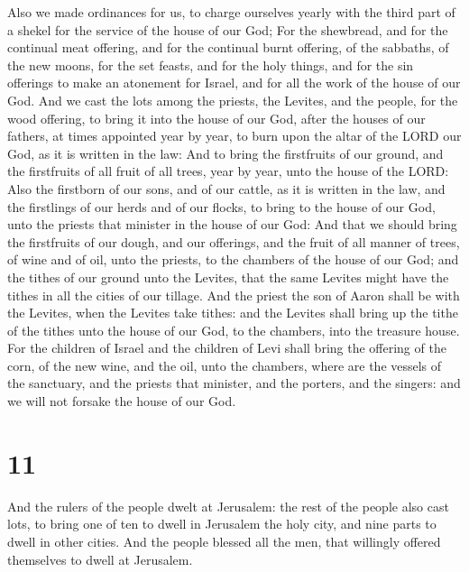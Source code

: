  Also we made ordinances for us, to charge ourselves
yearly with the third part of a shekel for the service of the house of
our God;  For the shewbread, and for the continual meat
offering, and for the continual burnt offering, of the sabbaths, of the
new moons, for the set feasts, and for the holy things, and for the sin
offerings to make an atonement for Israel, and for all the work of the
house of our God.  And we cast the lots among the
priests, the Levites, and the people, for the wood offering, to bring it
into the house of our God, after the houses of our fathers, at times
appointed year by year, to burn upon the altar of the LORD our God, as
it is written in the law:  And to bring the firstfruits
of our ground, and the firstfruits of all fruit of all trees, year by
year, unto the house of the LORD:  Also the firstborn of
our sons, and of our cattle, as it is written in the law, and the
firstlings of our herds and of our flocks, to bring to the house of our
God, unto the priests that minister in the house of our God:
 And that we should bring the firstfruits of our dough,
and our offerings, and the fruit of all manner of trees, of wine and of
oil, unto the priests, to the chambers of the house of our God; and the
tithes of our ground unto the Levites, that the same Levites might have
the tithes in all the cities of our tillage.  And the
priest the son of Aaron shall be with the Levites, when the Levites take
tithes: and the Levites shall bring up the tithe of the tithes unto the
house of our God, to the chambers, into the treasure house.
 For the children of Israel and the children of Levi
shall bring the offering of the corn, of the new wine, and the oil, unto
the chambers, where are the vessels of the sanctuary, and the priests
that minister, and the porters, and the singers: and we will not forsake
the house of our God.

\hypertarget{section-10}{%
\section{11}\label{section-10}}

 And the rulers of the people dwelt at Jerusalem: the rest
of the people also cast lots, to bring one of ten to dwell in Jerusalem
the holy city, and nine parts to dwell in other cities. 
And the people blessed all the men, that willingly offered themselves to
dwell at Jerusalem.

